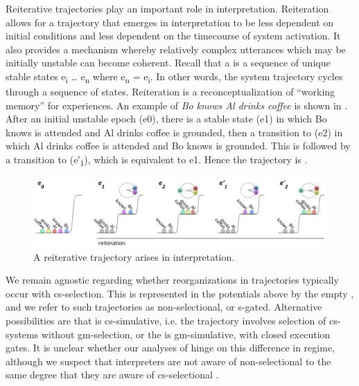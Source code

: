   Reiterative trajectories play an important role in interpretation. Reiteration allows for a trajectory that emerges in interpretation to be less dependent on initial conditions and less dependent on the timecourse of system activation. It also provides a mechanism whereby relatively complex utterances which may be initially unstable can become coherent. Recall that a  is a sequence of unique stable states e\textsubscript{i} … e\textsubscript{n} where e\textsubscript{n} = e\textsubscript{i}. In other words, the system trajectory cycles through a sequence of states. Reiteration is a reconceptualization of “working memory” for  experiences. An example  of \textit{Bo knows Al drinks coffee} is shown in {}. After an initial unstable epoch (e0), there is a stable state (e1) in which {\textbar}Bo knows{\textbar} is attended and {\textbar}Al drinks coffee{\textbar} is grounded, then a transition to (e2) in which {\textbar}Al drinks coffee{\textbar} is attended and {\textbar}Bo knows{\textbar} is grounded. This is followed by a transition to (e′\textsubscript{1}), which is equivalent to e1. Hence the trajectory is .

  
\begin{figure}
\includegraphics[width=\textwidth]{figures/Tilsen-img122.png}
\caption{A reiterative trajectory arises in interpretation.}
\label{fig:6:3}
\end{figure}
 

  We remain agnostic regarding whether reorganizations in  trajectories typically occur with cs-selection. This is represented in the potentials above by the empty , and we refer to such trajectories as non-selectional, or s-gated. Alternative possibilities are that  is cs-simulative, i.e. the trajectory involves selection of cs-sys\-tems without gm-selection, or the  is gm-simulative, with closed execution gates. It is unclear whether our analyses of  hinge on this difference in regime, although we suspect that interpreters are not aware of non-selectional  to the same degree that they are aware of cs-selectional .  

